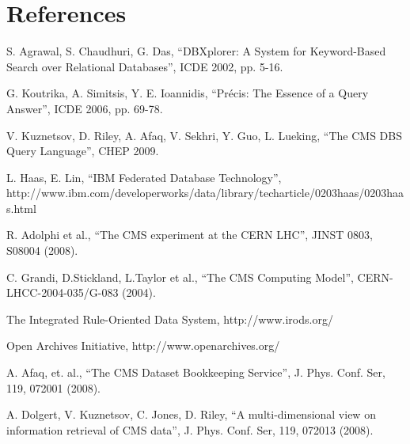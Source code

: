 \documentclass[1p,times]{elsarticle}
\begin{document}





\section*{References}
\begin{thebibliography}{00}
S. Agrawal, S. Chaudhuri, G. Das,
``DBXplorer: A System for Keyword-Based Search over Relational Databases'',
ICDE 2002, pp. 5-16.

G. Koutrika, A. Simitsis, Y. E. Ioannidis,
``Pr\'{e}cis: The Essence of a Query Answer'',
ICDE 2006, pp. 69-78.

V. Kuznetsov, D. Riley, A. Afaq, V. Sekhri, Y. Guo, L. Lueking,
``The CMS DBS Query Language'', CHEP 2009.


L. Haas, E. Lin,
``IBM Federated Database Technology'', \\
http://www.ibm.com/developerworks/data/library/techarticle/0203haas/0203haas.html

R. Adolphi et al., 
``The CMS experiment at the CERN LHC'',
JINST 0803, S08004 (2008).

C. Grandi, D.Stickland, L.Taylor et al.,
``The CMS Computing Model'',
CERN-LHCC-2004-035/G-083 (2004).

The Integrated Rule-Oriented Data System,
http://www.irods.org/

Open Archives Initiative,
http://www.openarchives.org/

A. Afaq, et. al.,
``The CMS Dataset Bookkeeping Service'', 
J. Phys. Conf. Ser, 119, 072001 (2008).

A. Dolgert, V. Kuznetsov, C. Jones, D. Riley, 
``A multi-dimensional view on information retrieval of CMS data'',
J. Phys. Conf. Ser, 119, 072013 (2008).


\end{thebibliography}
\end{document}
